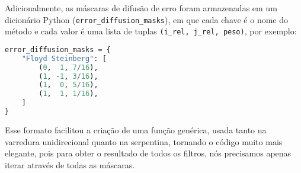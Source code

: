 \documentclass[12pt,a4paper]{article}
\begin{document}
Adicionalmente, as máscaras de difusão de erro foram armazenadas em um dicionário Python (\texttt{error\_diffusion\_masks}), em que cada chave é o nome do método e cada valor é uma lista de tuplas \texttt{(i\_rel, j\_rel, peso)}, por exemplo:

\begin{lstlisting}[language=Python, caption={Exemplo de definição das máscaras}]
error_diffusion_masks = {
    "Floyd Steinberg": [
        (0,  1, 7/16),
        (1, -1, 3/16),
        (1,  0, 5/16),
        (1,  1, 1/16),
    ]
}
\end{lstlisting}

Esse formato facilitou a criação de uma função genérica, usada tanto na varredura unidirecional quanto na serpentina, tornando o código muito mais elegante, pois para obter o resultado de todos os filtros, nós precisamos apenas iterar através de todas as máscaras.
\end{document}
